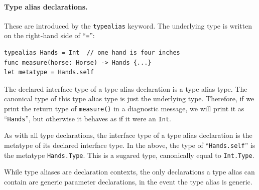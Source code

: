 \documentclass[../generics]{subfiles}
\begin{document}
\paragraph{Type alias declarations.} These are introduced by the \texttt{typealias} keyword. The underlying type is written on the right-hand side of ``\texttt{=}'':
\begin{Verbatim}
typealias Hands = Int  // one hand is four inches
func measure(horse: Horse) -> Hands {...}
let metatype = Hands.self
\end{Verbatim}
The declared interface type of a type alias declaration is a type alias type. The canonical type of this type alias type is just the underlying type. Therefore, if we print the return type of \texttt{measure()} in a diagnostic message, we will print it as ``\texttt{Hands}'', but otherwise it behaves as if it were an \texttt{Int}.

As with all type declarations, the interface type of a type alias declaration is the metatype of its declared interface type. In the above, the type of ``\texttt{Hands.self}'' is the metatype \texttt{Hands.Type}. This is a sugared type, canonically equal to \texttt{Int.Type}.

While type aliases are declaration contexts, the only declarations a type alias can contain are generic parameter declarations, in the event the type alias is generic.
\end{document}
